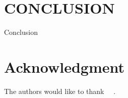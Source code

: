 \documentclass[journal]{IEEEtran}
\begin{document}
\section{CONCLUSION}
Conclusion


\section*{Acknowledgment}
The authors would like to thank ~~. 



%


\end{document}
